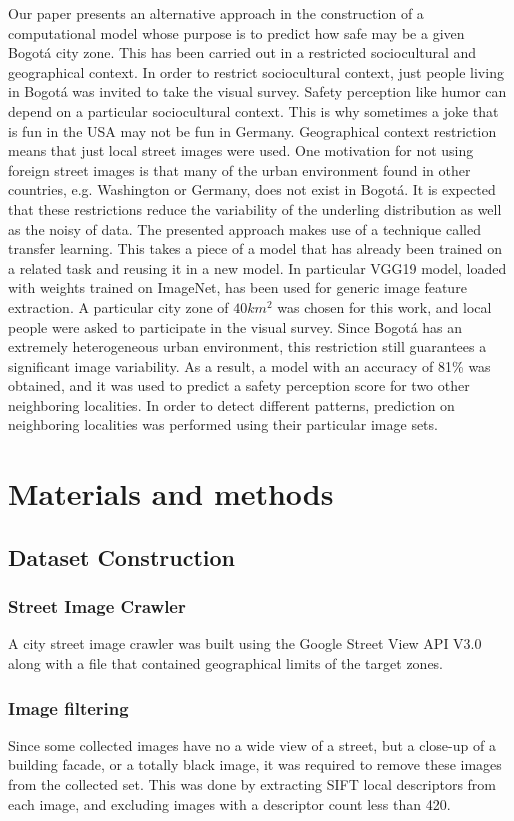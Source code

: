 \documentclass{llncs}
\begin{document}
Our paper presents an alternative approach in the construction of a computational model whose purpose is to predict how safe may be a given Bogotá city zone. This has been carried out in a restricted sociocultural and geographical context. In order to restrict sociocultural context, just people living in Bogotá was invited to take the visual survey. Safety perception like humor can depend on a particular sociocultural context. This is why sometimes a joke that is fun in the USA may not be fun in Germany. Geographical context restriction means that just local street images were used. One motivation for not using foreign street images is that many of the urban environment found in other countries, e.g. Washington or Germany, does not exist in Bogotá. It is expected that these restrictions reduce the variability of the underling distribution as well as the noisy of data. The presented approach makes use of a technique called transfer learning. This takes a piece of a model that has already been trained on a related task and reusing it in a new model. In particular VGG19 \cite{DBLP:journals/corr/SimonyanZ14a} model, loaded with weights trained on ImageNet, has been used for generic image feature extraction. A particular city zone of $40 km^{2}$  was chosen for this work, and local people were asked to participate in the visual survey. Since Bogotá has an extremely heterogeneous urban environment, this restriction still guarantees a significant image variability.  As a result, a model with an accuracy of 81\%  was obtained, and it was used to predict a safety perception score for two other neighboring localities. In order to detect different patterns, prediction on neighboring localities was performed using their particular image sets.

\section{Materials and methods}
\subsection{Dataset Construction}
\subsubsection{Street Image Crawler}
A city street image crawler was built using the Google Street View API V3.0 along with a file that contained geographical limits of the target zones.

\subsubsection{Image filtering}
Since some collected images have no a wide view of a street, but a close-up of a building facade, or a totally black image, it was required to remove these images from the collected set. This was done by extracting SIFT local descriptors from each image, and excluding images with a descriptor count less than 420.
  
\end{document}

